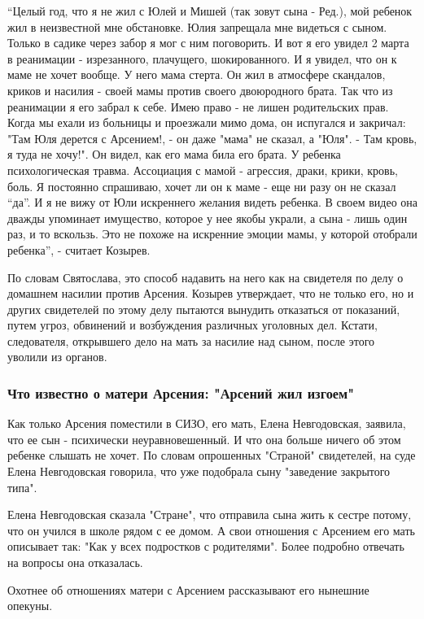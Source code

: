 “Целый год, что я не жил с Юлей и Мишей (так зовут сына - Ред.), мой ребенок
жил в неизвестной мне обстановке. Юлия запрещала мне видеться с сыном. Только в
садике через забор я мог с ним поговорить. И вот я его увидел 2 марта в
реанимации - изрезанного, плачущего, шокированного. И я увидел, что он к маме
не хочет вообще. У него мама стерта. Он жил в атмосфере скандалов, криков и
насилия - своей мамы против своего двоюродного брата. Так что из реанимации я
его забрал к себе. Имею право - не лишен родительских прав. Когда мы ехали из
больницы и проезжали мимо дома, он испугался и закричал: "Там Юля дерется с
Арсением!, - он даже "мама" не сказал, а "Юля". - Там кровь, я туда не хочу!".
Он видел, как его мама била его брата. У ребенка психологическая травма.
Ассоциация с мамой - агрессия, драки, крики, кровь, боль. Я постоянно
спрашиваю, хочет ли он к маме - еще ни разу он не сказал “да”. И я не вижу от
Юли искреннего желания видеть ребенка. В своем видео она дважды упоминает
имущество, которое у нее якобы украли, а сына - лишь один раз, и то вскользь.
Это не похоже на искренние эмоции мамы, у которой отобрали ребенка”, - считает
Козырев.

По словам Святослава, это способ надавить на него как на свидетеля по делу о
домашнем насилии против Арсения. Козырев утверждает, что не только его, но и
других свидетелей по этому делу пытаются вынудить отказаться от показаний,
путем угроз, обвинений и возбуждения различных уголовных дел. Кстати,
следователя, открывшего дело на мать за насилие над сыном, после этого уволили
из органов. 

\subsubsection{Что известно о матери Арсения: "Арсений жил изгоем"}

Как только Арсения поместили в СИЗО, его мать, Елена Невгодовская, заявила, что
ее сын - психически неуравновешенный. И что она больше ничего об этом ребенке
слышать не хочет. По словам опрошенных "Страной" свидетелей, на суде Елена
Невгодовская говорила, что уже подобрала сыну "заведение закрытого типа".

Елена Невгодовская сказала "Стране", что отправила сына жить к сестре потому,
что он учился в школе рядом с ее домом. А свои отношения с Арсением его мать
описывает так: "Как у всех подростков с родителями". Более подробно отвечать на
вопросы она отказалась. 

Охотнее об отношениях матери с Арсением рассказывают его нынешние опекуны.


